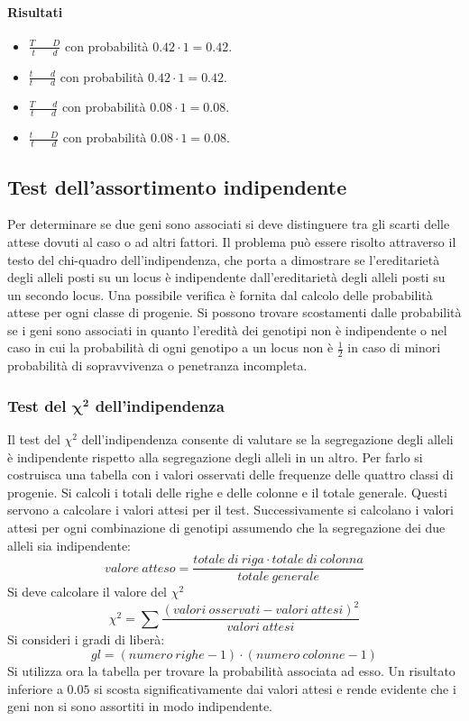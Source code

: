 				\paragraph{Risultati}
				\begin{multicols}{2}
					\begin{itemize}
						\item $\frac{T\qquad D}{t\qquad d}$ con probabilit\`a $0.42\cdot 1 = 0.42$.
						\item $\frac{t\qquad d}{t\qquad d}$ con probabilit\`a $0.42\cdot 1 = 0.42$.
						\item $\frac{T\qquad d}{t\qquad d}$ con probabilit\`a $0.08\cdot 1 = 0.08$.
						\item $\frac{t\qquad D}{t\qquad d}$ con probabilit\`a $0.08\cdot 1 = 0.08$.
					\end{itemize}
				\end{multicols}

	\subsection{Test dell'assortimento indipendente}
	Per determinare se due geni sono associati si deve distinguere tra gli scarti delle attese dovuti al caso o ad altri fattori.
	Il problema pu\`o essere risolto attraverso il testo del chi-quadro dell'indipendenza, che porta a dimostrare se l'ereditariet\`a degli alleli posti su un locus \`e indipendente dall'ereditariet\`a degli alleli posti su un secondo locus.
	Una possibile verifica \`e fornita dal calcolo delle probabilit\`a attese per ogni classe di progenie.
	Si possono trovare scostamenti dalle probabilit\`a se i geni sono associati in quanto l'eredit\`a dei genotipi non \`e indipendente o nel caso in cui la probabilit\`a di ogni genotipo a un locus non \`e $\frac{1}{2}$ in caso di minori probabilit\`a di sopravvivenza o penetranza incompleta.

		\subsubsection{Test del $\mathbf{\chi^2}$ dell'indipendenza}
		Il test del $\chi^2$ dell'indipendenza consente di valutare se la segregazione degli alleli \`e indipendente rispetto alla segregazione degli alleli in un altro.
		Per farlo si costruisca una tabella con i valori osservati delle frequenze delle quattro classi di progenie.
		Si calcoli i totali delle righe e delle colonne e il totale generale.
		Questi servono a calcolare i valori attesi per il test.
		Successivamente si calcolano i valori attesi per ogni combinazione di genotipi assumendo che la segregazione dei due alleli sia indipendente:
		\[valore\ atteso = \dfrac{totale\ di\ riga\cdot totale\ di\ colonna}{totale\ generale}\]
		Si deve calcolare il valore del $\chi^2$
		\[\chi^2 = \sum\dfrac{(valori\ osservati - valori\ attesi)^2}{valori\ attesi}\]
		Si consideri i gradi di liber\`a:
		\[gl = (numero\ righe - 1)\cdot(numero\ colonne - 1)\]
		Si utilizza ora la tabella per trovare la probabilit\`a associata ad esso.
		Un risultato inferiore a $0.05$ si scosta significativamente dai valori attesi e rende evidente che i geni non si sono assortiti in modo indipendente.

